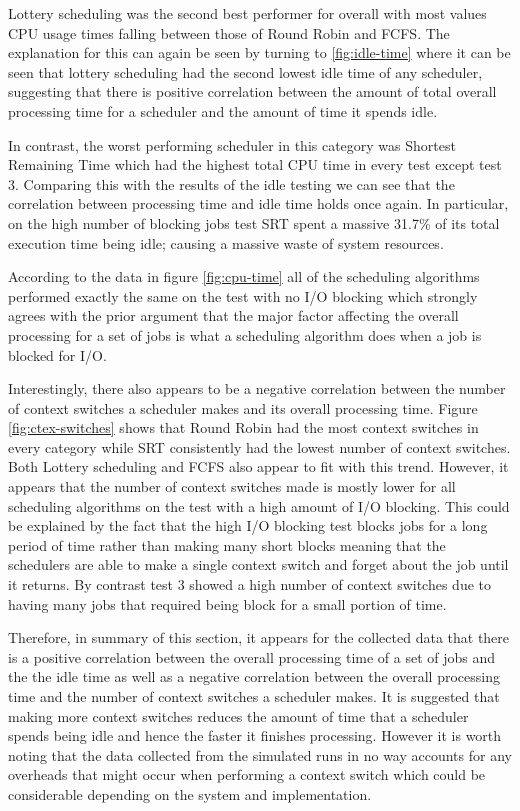 \documentclass{acm_proc_article-sp}
\begin{document}
Lottery scheduling was the second best performer for overall with most values CPU usage times falling between those of Round Robin and FCFS. The explanation for this can again be seen by turning to \ref{fig:idle-time} where it can be seen that lottery scheduling had the second lowest idle time of any scheduler, suggesting that there is positive correlation between the amount of total overall processing time for a scheduler and the amount of time it spends idle.

In contrast, the worst performing scheduler in this category was Shortest Remaining Time which had the highest total CPU time in every test except test 3. Comparing this with the results of the idle testing we can see that the correlation between processing time and idle time holds once again. In particular, on the high number of blocking jobs test SRT spent a massive 31.7\% of its total execution time being idle; causing a massive waste of system resources.

According to the data in figure \ref{fig:cpu-time} all of the scheduling algorithms performed exactly the same on the test with no I/O blocking which strongly agrees with the prior argument that the major factor affecting the overall processing for a set of jobs is what a scheduling algorithm does when a job is blocked for I/O.

Interestingly, there also appears to be a negative correlation between the number of context switches a scheduler makes and its overall processing time. Figure \ref{fig:ctex-switches} shows that Round Robin had the most context switches in every category while SRT consistently had the lowest number of context switches. Both Lottery scheduling and FCFS also appear to fit with this trend. However, it appears that the number of context switches made is mostly lower for all scheduling algorithms on the test with a high amount of I/O blocking. This could be explained by the fact that the high I/O blocking test blocks jobs for a long period of time rather than making many short blocks meaning that the schedulers are able to make a single context switch and forget about the job until it returns. By contrast test 3 showed a high number of context switches due to having many jobs that required being block for a small portion of time.

Therefore, in summary of this section, it appears for the collected data that there is a positive correlation between the overall processing time of a set of jobs and the the idle time as well as a negative correlation between the overall processing time and the number of context switches a scheduler makes. It is suggested that making more context switches reduces the amount of time that a scheduler spends being idle and hence the faster it finishes processing. However it is worth noting that the data collected from the simulated runs in no way accounts for any overheads that might occur when performing a context switch which could be considerable depending on the system and implementation.
\end{document}
